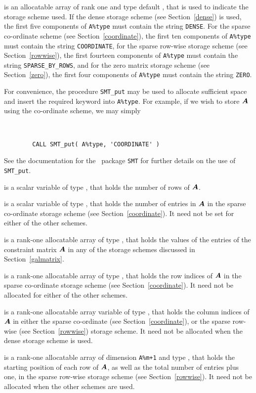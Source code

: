\documentclass{galahad}
\begin{document}
\begin{description}
\begin{description}

 is an allocatable array of rank one and type default
\character, that
is used to indicate the storage scheme used. If the dense storage scheme
(see Section~\ref{dense}) is used,
the first five components of {\tt A\%type} must contain the
string {\tt DENSE}.
For the sparse co-ordinate scheme (see Section~\ref{coordinate}),
the first ten components of {\tt A\%type} must contain the
string {\tt COORDINATE},
for the sparse row-wise storage scheme (see Section~\ref{rowwise}),
the first fourteen components of {\tt A\%type} must contain the
string {\tt SPARSE\_BY\_ROWS},
and for the zero matrix storage scheme (see Section~\ref{zero}),
the first four components of {\tt A\%type} must contain the
string {\tt ZERO}.

For convenience, the procedure {\tt SMT\_put}
may be used to allocate sufficient space and insert the required keyword
into {\tt A\%type}.
For example, if we wish to store ${\bm{A}}$ using the co-ordinate scheme,
we may simply
{\tt
\begin{verbatim}
        CALL SMT_put( A%type, 'COORDINATE' )
\end{verbatim}
}
\noindent
See the documentation for the \galahad\ package {\tt SMT}
for further details on the use of {\tt SMT\_put}.

 is a scalar variable of type \integer, that
holds the number of rows of ${\bm{A}}$.

 is a scalar variable of type \integer, that
holds the number of entries in ${\bm{A}}$
in the sparse co-ordinate storage scheme (see Section~\ref{coordinate}).
It need not be set for either of the other schemes.

 is a rank-one allocatable array of type \realdp, that holds
the values of the entries of the constraint matrix ${\bm{A}}$ in any of the
storage schemes discussed in Section~\ref{galmatrix}.

 is a rank-one allocatable array of type \integer,
that holds the row indices of ${\bm{A}}$ in the sparse co-ordinate storage
scheme (see Section~\ref{coordinate}).
It need not be allocated for either of the other schemes.

 is a rank-one allocatable array variable of type \integer,
that holds the column indices of ${\bm{A}}$ in either the sparse co-ordinate
(see Section~\ref{coordinate}), or the sparse row-wise
(see Section~\ref{rowwise}) storage scheme.
It need not be allocated when the dense storage scheme is used.

 is a rank-one allocatable array of dimension {\tt A\%m+1} and type
\integer, that holds the starting position of
each row of ${\bm{A}}$, as well
as the total number of entries plus one, in the sparse row-wise storage
scheme (see Section~\ref{rowwise}). It need not be allocated when the
other schemes are used.
\end{description}

\end{description}
\end{document}
